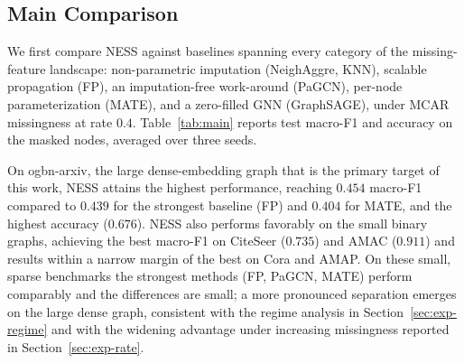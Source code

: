 \subsection{Main Comparison}
\label{sec:exp-main}

We first compare NESS against baselines spanning every category of the missing-feature landscape: non-parametric imputation (NeighAggre, KNN), scalable propagation (FP), an imputation-free work-around (PaGCN), per-node parameterization (MATE), and a zero-filled GNN (GraphSAGE), under MCAR missingness at rate $0.4$. Table~\ref{tab:main} reports test macro-F1 and accuracy on the masked nodes, averaged over three seeds.

On ogbn-arxiv, the large dense-embedding graph that is the primary target of this work, NESS attains the highest performance, reaching $0.454$ macro-F1 compared to $0.439$ for the strongest baseline (FP) and $0.404$ for MATE, and the highest accuracy ($0.676$). NESS also performs favorably on the small binary graphs, achieving the best macro-F1 on CiteSeer ($0.735$) and AMAC ($0.911$) and results within a narrow margin of the best on Cora and AMAP. On these small, sparse benchmarks the strongest methods (FP, PaGCN, MATE) perform comparably and the differences are small; a more pronounced separation emerges on the large dense graph, consistent with the regime analysis in Section~\ref{sec:exp-regime} and with the widening advantage under increasing missingness reported in Section~\ref{sec:exp-rate}.

\begin{table}[t]
\centering
\caption{Main comparison under MCAR missingness at rate $0.4$. Each cell reports test macro-F1 / accuracy on masked nodes, averaged over three seeds. Best macro-F1 per dataset in \textbf{bold}.}
\label{tab:main}
\end{table}
